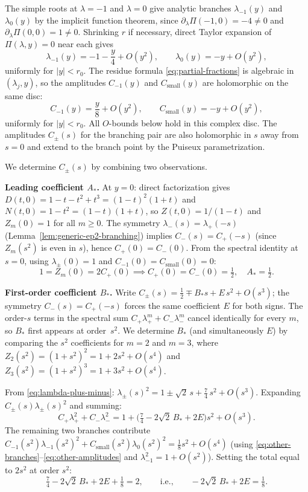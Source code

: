 The simple roots at $\lambda=-1$ and $\lambda=0$ give analytic branches $\lambda_{-1}(y)$ and $\lambda_0(y)$ by the implicit function theorem, since $\partial_\lambda\Pi(-1,0)=-4\neq0$ and $\partial_\lambda\Pi(0,0)=1\neq0$.
Shrinking $r$ if necessary, direct Taylor expansion of $\Pi(\lambda,y)=0$ near each gives
\begin{equation}\label{eq:other-branches}
\lambda_{-1}(y)=-1-\frac{y}{4}+O(y^2),
\qquad
\lambda_0(y)=-y+O(y^2),
\end{equation}
uniformly for $|y|<r_0$.
The residue formula \eqref{eq:partial-fractions} is algebraic in $(\lambda_j,y)$, so the amplitudes $C_{-1}(y)$ and $C_{\mathrm{small}}(y)$ are holomorphic on the same disc:
\begin{equation}\label{eq:other-amplitudes}
C_{-1}(y)=\frac{y}{8}+O(y^2),
\qquad
C_{\mathrm{small}}(y)=-y+O(y^2),
\end{equation}
uniformly for $|y|<r_0$.
All $O$-bounds below hold in this complex disc.
The amplitudes $C_\pm(s)$ for the branching pair are also holomorphic in $s$ away from $s=0$ and extend to the branch point by the Puiseux parametrization.

We determine $C_\pm(s)$ by combining two observations.

\textbf{Leading coefficient $A_*$.}
At $y=0$: direct factorization gives $D(t,0)=1-t-t^2+t^3=(1-t)^2(1+t)$ and $N(t,0)=1-t^2=(1-t)(1+t)$, so $Z(t,0)=1/(1-t)$ and $Z_m(0)=1$ for all $m\ge0$.
The symmetry $\lambda_-(s)=\lambda_+(-s)$ (Lemma~\ref{lem:generic-ep2-branching}) implies $C_-(s)=C_+(-s)$ (since $Z_m(s^2)$ is even in $s$), hence $C_+(0)=C_-(0)$.
From the spectral identity at $s=0$, using $\lambda_\pm(0)=1$ and $C_{-1}(0)=C_{\mathrm{small}}(0)=0$:
\[
1 = Z_m(0) = 2C_+(0) \implies C_+(0) = C_-(0) = \tfrac{1}{2},\quad A_*=\tfrac12.
\]

\textbf{First-order coefficient $B_*$.}
Write $C_\pm(s)=\tfrac12\mp B_*s+E\,s^2+O(s^3)$; the symmetry $C_-(s)=C_+(-s)$ forces the same coefficient $E$ for both signs.
The order-$s$ terms in the spectral sum $C_+\lambda_+^m+C_-\lambda_-^m$ cancel identically for every $m$, so $B_*$ first appears at order~$s^2$.
We determine $B_*$ (and simultaneously $E$) by comparing the $s^2$ coefficients for $m=2$ and $m=3$, where $Z_2(s^2)=(1+s^2)^2=1+2s^2+O(s^4)$ and $Z_3(s^2)=(1+s^2)^3=1+3s^2+O(s^4)$.

From \eqref{eq:lambda-plus-minus}: $\lambda_\pm(s)^2=1\pm\sqrt2\,s+\tfrac74\,s^2+O(s^3)$.
Expanding $C_\pm(s)\lambda_\pm(s)^2$ and summing:
\[
C_+\lambda_+^2+C_-\lambda_-^2
= 1+\bigl(\tfrac74-2\sqrt2\,B_*+2E\bigr)s^2+O(s^3).
\]
The remaining two branches contribute $C_{-1}(s^2)\lambda_{-1}(s^2)^2+C_{\mathrm{small}}(s^2)\lambda_0(s^2)^2=\tfrac{1}{8}s^2+O(s^4)$
(using \eqref{eq:other-branches}--\eqref{eq:other-amplitudes} and $\lambda_{-1}^2=1+O(s^2)$).
Setting the total equal to $2s^2$ at order $s^2$:
\begin{equation}\label{eq:Bstar-m2}
\tfrac74 - 2\sqrt2\,B_* + 2E + \tfrac18 = 2,
\qquad\text{i.e.,}\qquad
-2\sqrt2\,B_* + 2E = \tfrac18.
\end{equation}

